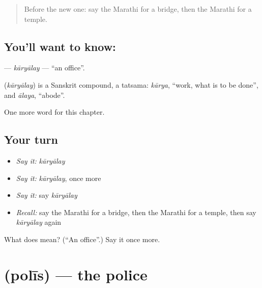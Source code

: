 \label{lesson:MR-C114-karyalay}



\begin{quote}
Before the new one: say the Marathi for a bridge, then the Marathi for a temple.
\end{quote}

\subsection*{You'll want to know: }
\textbf{} — \emph{kāryālay} — \textquotedblleft{}an office\textquotedblright{}.

\begin{cousinweb}
\textbf{} (\emph{kāryālay}) is a Sanskrit compound, a tatsama: \emph{kārya}, \textquotedblleft{}work, what is to be done\textquotedblright{}, and \emph{ālaya}, \textquotedblleft{}abode\textquotedblright{}.
\end{cousinweb}

\begin{grammarlens}[title={What you've built}]
One more word for this chapter.
\end{grammarlens}

\subsection*{Your turn}
\begin{itemize}
\raggedright
  \item \emph{Say it:} \emph{kāryālay}
  \item \emph{Say it:} \emph{kāryālay}, once more
  \item \emph{Say it:} say \emph{kāryālay}
  \item \emph{Recall:} say the Marathi for a bridge, then the Marathi for a temple, then say \emph{kāryālay} again
\end{itemize}

\begin{tcolorbox}[breakable,colback=teal!4,colframe=teal!35!black,title={Before you move on}]
What does  mean? (\textquotedblleft{}An office\textquotedblright{}.) Say it once more.
\end{tcolorbox}
\section[\texorpdfstring{\mr{पोलीस} (polīs)}{पोलीस (polīs)}]{ (polīs) — the police}

